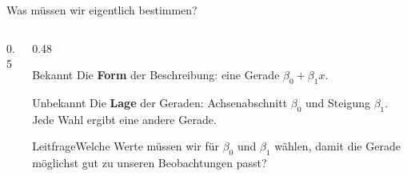 \documentclass[aspectratio=169,11pt]{beamer}
\newcommand{\leitfrage}[1]{\begin{exampleblock}{Leitfrage}#1\end{exampleblock}}
\newcommand{\werbepunkte}{\addplot[only marks, mark=*, mark size=2.2pt, color=hsbiblue]
  coordinates {(1,33) (3,30) (4,37) (5,33) (6,38) (8,41) (8,39) (9,43) (10,45) (11,40) (12,42) (13,47)};}
\begin{document}
\begin{frame}{Was müssen wir eigentlich bestimmen?}
  \begin{columns}[T]
    \begin{column}{0.5\textwidth}
    \end{column}
    \begin{column}{0.48\textwidth}
      \begin{block}{Bekannt}
        Die \textbf{Form} der Beschreibung: eine Gerade $\beta_0 + \beta_1 x$.
      \end{block}
      \begin{alertblock}{Unbekannt}
        Die \textbf{Lage} der Geraden: Achsenabschnitt $\beta_0$ und Steigung
        $\beta_1$. Jede Wahl ergibt eine andere Gerade.
      \end{alertblock}
      \leitfrage{Welche Werte müssen wir für $\beta_0$ und $\beta_1$ wählen, damit die
        Gerade möglichst gut zu unseren Beobachtungen passt?}
    \end{column}
  \end{columns}
\end{frame}
\end{document}
